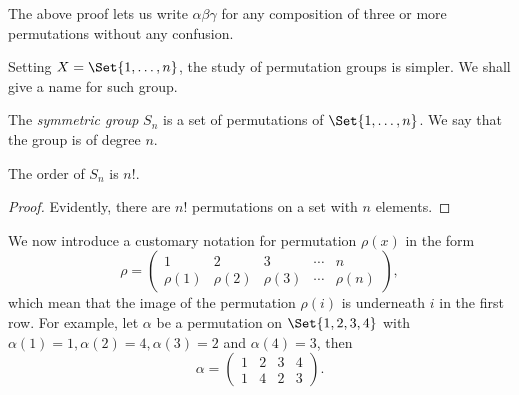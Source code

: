 \documentclass[main.tex]{subfiles}
\begin{document}
				The above proof lets us write $\alpha\beta\gamma$ for any composition of three or more permutations without any confusion.
				
				Setting $X = \Set{1, \ldots, n}$, the study of permutation groups is simpler. We shall give a name for such group.
				\begin{definition}
					The \textit{symmetric group}  $S_n$ is a set of permutations of $\Set{1, \ldots, n}$. We say that the group is of degree $n$.
				\end{definition}

				\begin{theorem}
					The order of $S_n$ is $n!$.
				\end{theorem}
				\begin{proof}
					Evidently, there are $n!$ permutations on a set with $n$ elements.
				\end{proof}
				We now introduce a customary notation for permutation $\rho(x)$ in the form
				\begin{equation*}
					\rho =
					\begin{pmatrix}
						1 & 2 & 3 & \cdots & n \\
						\rho(1) & \rho(2) & \rho(3) & \cdots & \rho(n)
					\end{pmatrix},
				\end{equation*}
				which mean that the image of the permutation $\rho(i)$ is underneath $i$ in the first row. For example, let $\alpha$ be a permutation on $\Set{1, 2, 3, 4}$ with $\alpha(1) = 1, \alpha(2) = 4, \alpha(3) = 2$ and $\alpha(4) = 3$, then
				\begin{equation*}
				\alpha =
				\begin{pmatrix}
					1 & 2 & 3 & 4\\
					1 & 4 & 2 & 3
				\end{pmatrix}.
				\end{equation*}
\end{document}
